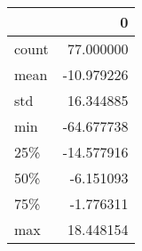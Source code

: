 \begin{tabular}{lr}
\toprule
{} &          0 \\
\midrule
count &  77.000000 \\
mean  & -10.979226 \\
std   &  16.344885 \\
min   & -64.677738 \\
25\%   & -14.577916 \\
50\%   &  -6.151093 \\
75\%   &  -1.776311 \\
max   &  18.448154 \\
\bottomrule
\end{tabular}
